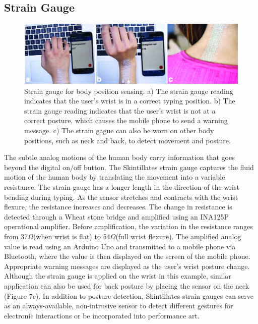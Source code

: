 \documentclass{sigchi}
\begin{document}
\subsection {Strain Gauge}
\begin{figure}
\centering
\includegraphics[width=1.0\textwidth]{figures/Figure10}
\caption{Strain gauge for body position sensing. a) The strain gauge reading indicates that the user's wrist is in a correct typing position. b) The strain gauge reading indicates that the user's wrist is not at a correct posture, which causes the mobile phone to send a warning message. c) The strain gague can also be worn on other body positions, such as neck and back, to detect movement and posture.}
\vspace{-8pt}
\label{fig:straingauge}
\end{figure}
The subtle analog motions of the human body carry information that goes beyond the digital on/off button. The Skintillates strain gauge captures the fluid motion of the human body by translating the movement into a variable resistance. 
 The strain gauge has a longer length in the direction of the wrist bending during typing. As the sensor stretches and contracts with the wrist flexure, the resistance increases and decreases. The change in resistance is detected through a Wheat stone bridge and amplified using an INA125P operational amplifier. Before amplification, the variation in the resistance ranges from 37$\Omega$(when wrist is flat) to 54$\Omega$(full wrist flexure). The amplified analog value is read using an Arduino Uno and transmitted to a mobile phone via Bluetooth, where the value is then displayed on the screen of the mobile phone. Appropriate warning messages are displayed as the user’s wrist posture change. Although the strain gauge is applied on the wrist in this example, similar application can also be used for back posture by placing the sensor on the neck (Figure 7c). In addition to posture detection, Skintillates strain gauges can serve as an always-available, non-intrusive sensor to detect different gestures for electronic interactions or be incorporated into performance art. 
\end{document}
